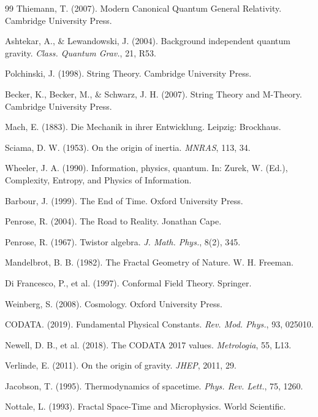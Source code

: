 \begin{thebibliography}{99}
		Thiemann, T. (2007). Modern Canonical Quantum General Relativity. Cambridge University Press.
		
		Ashtekar, A., \& Lewandowski, J. (2004). Background independent quantum gravity. \emph{Class. Quantum Grav.}, 21, R53.
		
		Polchinski, J. (1998). String Theory. Cambridge University Press.
		
		Becker, K., Becker, M., \& Schwarz, J. H. (2007). String Theory and M-Theory. Cambridge University Press.
		
		Mach, E. (1883). Die Mechanik in ihrer Entwicklung. Leipzig: Brockhaus.
		
		Sciama, D. W. (1953). On the origin of inertia. \emph{MNRAS}, 113, 34.
		
		Wheeler, J. A. (1990). Information, physics, quantum. In: Zurek, W. (Ed.), Complexity, Entropy, and Physics of Information.
		
		Barbour, J. (1999). The End of Time. Oxford University Press.
		
		Penrose, R. (2004). The Road to Reality. Jonathan Cape.
		
		Penrose, R. (1967). Twistor algebra. \emph{J. Math. Phys.}, 8(2), 345.
		
		Mandelbrot, B. B. (1982). The Fractal Geometry of Nature. W. H. Freeman.
		
		Di Francesco, P., et al. (1997). Conformal Field Theory. Springer.
		
		Weinberg, S. (2008). Cosmology. Oxford University Press.
		
		CODATA. (2019). Fundamental Physical Constants. \emph{Rev. Mod. Phys.}, 93, 025010.
		
		Newell, D. B., et al. (2018). The CODATA 2017 values. \emph{Metrologia}, 55, L13.
		
		Verlinde, E. (2011). On the origin of gravity. \emph{JHEP}, 2011, 29.
		
		Jacobson, T. (1995). Thermodynamics of spacetime. \emph{Phys. Rev. Lett.}, 75, 1260.
		
		Nottale, L. (1993). Fractal Space-Time and Microphysics. World Scientific.
		

\end{thebibliography}
